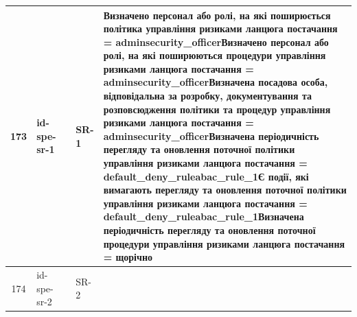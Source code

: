 \documentclass[10pt]{article}
\begin{document}
\begin{longtable}{|c|>{\raggedright\arraybackslash}p{4cm}|>{\raggedright\arraybackslash}p{2.5cm}|>{\raggedright\arraybackslash}p{3.5cm}|>{\raggedright\arraybackslash}p{5.5cm}|}
173 & id-spe-sr-1 &  & SR-1 & Визначено персонал або ролі, на які поширюється політика управління ризиками ланцюга постачання = \textbf{adminsecurity\_\allowbreak{}officer}\newline Визначено персонал або ролі, на які поширюються процедури управління ризиками ланцюга постачання = \textbf{adminsecurity\_\allowbreak{}officer}\newline Визначена посадова особа, відповідальна за розробку, документування та розповсюдження політики та процедур управління ризиками ланцюга постачання = \textbf{adminsecurity\_\allowbreak{}officer}\newline Визначена періодичність перегляду та оновлення поточної політики управління ризиками ланцюга постачання = \textbf{default\_\allowbreak{}deny\_\allowbreak{}ruleabac\_\allowbreak{}rule\_\allowbreak{}1}\newline Є події, які вимагають перегляду та оновлення поточної політики управління ризиками ланцюга постачання = \textbf{default\_\allowbreak{}deny\_\allowbreak{}ruleabac\_\allowbreak{}rule\_\allowbreak{}1}\newline Визначена періодичність перегляду та оновлення поточної процедури управління ризиками ланцюга постачання = \textbf{щорічно} \\ \hline
174 & id-spe-sr-2 &  & SR-2 &  \\ \hline

\end{longtable}
\end{document}
